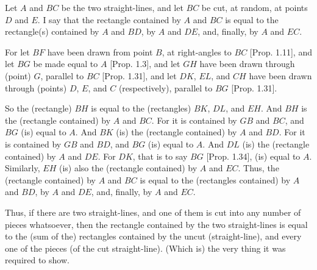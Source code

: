 \begin{Parallel}{}{}
{\epsfysize=2.2in
\centerline{}

Let $A$ and $BC$ be the two straight-lines, and let $BC$ be cut, at random,
at points $D$ and $E$. I say that the rectangle contained by $A$ and $BC$ is equal
to the rectangle(s) contained by $A$ and $BD$, by $A$ and $DE$, and, finally, by $A$ and
$EC$.

For let $BF$ have been drawn from point $B$, at right-angles to $BC$ [Prop. 1.11],
and let $BG$ be made equal to $A$ [Prop. 1.3], and let $GH$ have been drawn through
(point) $G$, parallel to $BC$ [Prop. 1.31], and let $DK$, $EL$, and $CH$ have been drawn through (points) $D$, $E$, and $C$ (respectively), parallel to $BG$ [Prop. 1.31].

So the (rectangle) $BH$ is equal to the (rectangles) $BK$, $DL$, and $EH$. And
$BH$ is  the (rectangle contained) by $A$ and $BC$. For it is contained by $GB$ and $BC$, and $BG$ (is) equal to $A$. And  $BK$ (is) the (rectangle contained) by $A$ and $BD$.
For it is contained by $GB$ and $BD$, and $BG$ (is) equal to $A$. And $DL$ (is) the (rectangle contained) by $A$ and $DE$.
For $DK$, that is to say $BG$ [Prop. 1.34], (is) equal to $A$. Similarly, $EH$ (is)
also the (rectangle contained) by $A$ and $EC$. Thus, the (rectangle contained) by $A$ and $BC$ is
equal to the (rectangles contained) by $A$ and $BD$,  by $A$ and $DE$, and, finally,
by $A$ and $EC$.

Thus, if there are two straight-lines, and one of them is cut into any number 
of pieces whatsoever, then the rectangle contained by the two straight-lines is
equal to the (sum of the) rectangles contained by the uncut (straight-line), and every one of the pieces (of the cut straight-line). (Which is) the very thing it was required to show.}
\end{Parallel}


\vspace{7pt}{\footnotesize \noindent$^\dag$ This proposition is a geometric version
of the algebraic identity: $a \,(b+c+d+\cdots) = a\,b + a\,c + a\,d + \cdots$.}

